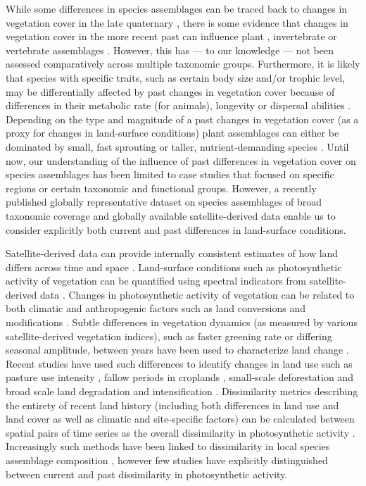 While some differences in species assemblages can be traced back to changes in vegetation cover in the late quaternary \citep{Vegas-Vilarrubia2011,McMichael2017}, there is some evidence that changes in vegetation cover in the more recent past can influence plant \citep{Jakovac2016}, invertebrate \citep{Valtonen2013} or vertebrate assemblages \citep{Newton2014, Cole2015, Graham2015}. However, this has — to our knowledge — not been assessed comparatively across multiple taxonomic groups. Furthermore, it is likely that species with specific traits, such as certain body size and/or trophic level, may be differentially affected by past changes in vegetation cover because of differences in their metabolic rate (for animals), longevity or dispersal abilities \citep{Sutherland2000, Brown2004, Speakman2005,Thomson2011,DePalma2015}. Depending on the type and magnitude of a past changes in vegetation cover (as a proxy for changes in land-surface conditions) plant assemblages can either be dominated by small, fast sprouting or taller, nutrient-demanding species \citep{Jakovac2016,Perring2018}. Until now, our understanding of the influence of past differences in vegetation cover on species assemblages has been limited to case studies that focused on specific regions or certain taxonomic and functional groups. However, a recently published globally representative dataset on species assemblages of broad taxonomic coverage \citep{Hudson2016} and globally available satellite-derived data enable us to consider explicitly both current and past differences in land-surface conditions.

Satellite-derived data can provide internally consistent estimates of how land differs across time and space \citep{Pettorelli2005, Kennedy2014}. Land-surface conditions such as photosynthetic activity of vegetation can be quantified using spectral indicators from satellite-derived data \citep{Gamon1995, Zhang2006}. Changes in photosynthetic activity of vegetation can be related to both climatic \citep{Fensholt2012, Zhu2016} and anthropogenic factors such as land conversions and modifications \citep{Lambin2003, Muller2014}. Subtle differences in vegetation dynamics (as measured by various satellite-derived vegetation indices), such as faster greening rate or differing seasonal amplitude, between years have been used to characterize land change \citep{Lambin1994, Linderman2005, Lupo2007}. Recent studies have used such differences to identify changes in land use such as pasture use intensity \citep{Rufin2015}, fallow periods in croplands \citep{Estel2015, Tong2017}, small-scale deforestation \citep{DeVries2015b} and broad scale land degradation and intensification \citep{dejong2011,Muller2014}. Dissimilarity metrics describing the entirety of recent land history (\eg including both differences in land use and land cover as well as climatic and site-specific factors) can be calculated between spatial pairs of time series as the overall dissimilarity in photosynthetic activity \citep{Linderman2005, Lhermitte2011}. Increasingly such methods have been linked to dissimilarity in local species assemblage composition \citep{Rowhani2008, Goetz2014, Nieto2015, Hobi2017}, however few studies have explicitly distinguished between current and past dissimilarity in photosynthetic activity.
	
